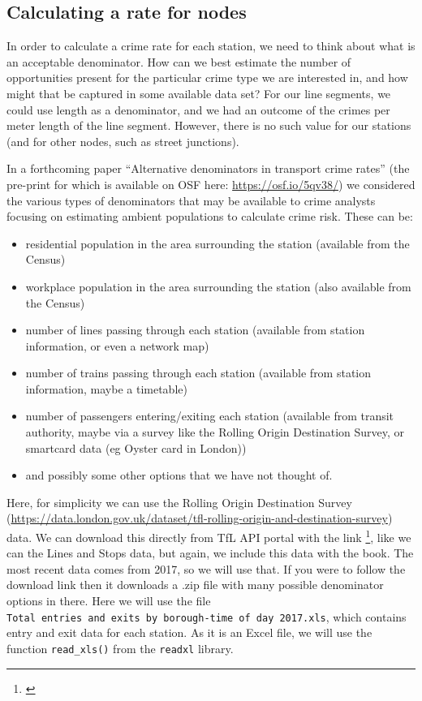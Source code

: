 \documentclass[
  krantz2]{krantz}
\providecommand{\tightlist}{%
  \setlength{\itemsep}{0pt}\setlength{\parskip}{0pt}}
\renewcommand{\href}[2]{#2\footnote{\url{#1}}}
\begin{document}
\hypertarget{calculating-a-rate-for-nodes}{%
\subsection{Calculating a rate for nodes}\label{calculating-a-rate-for-nodes}}

In order to calculate a crime rate for each station, we need to think about what is an acceptable denominator. How can we best estimate the number of opportunities present for the particular crime type we are interested in, and how might that be captured in some available data set? For our line segments, we could use length as a denominator, and we had an outcome of the crimes per meter length of the line segment. However, there is no such value for our stations (and for other nodes, such as street junctions).

In a forthcoming paper ``Alternative denominators in transport crime rates'' (the pre-print for which is available on OSF here: \url{https://osf.io/5qv38/}) we considered the various types of denominators that may be available to crime analysts focusing on estimating ambient populations to calculate crime risk. These can be:

\begin{itemize}
\tightlist
\item
  residential population in the area surrounding the station (available from the Census)
\item
  workplace population in the area surrounding the station (also available from the Census)
\item
  number of lines passing through each station (available from station information, or even a network map)
\item
  number of trains passing through each station (available from station information, maybe a timetable)
\item
  number of passengers entering/exiting each station (available from transit authority, maybe via a survey like the Rolling Origin Destination Survey, or smartcard data (eg Oyster card in London))
\item
  and possibly some other options that we have not thought of.
\end{itemize}

Here, for simplicity we can use the Rolling Origin Destination Survey (\url{https://data.london.gov.uk/dataset/tfl-rolling-origin-and-destination-survey}) data. We can download this directly from TfL API portal with the link \href{}{}, like we can the Lines and Stops data, but again, we include this data with the book. The most recent data comes from 2017, so we will use that. If you were to follow the download link then it downloads a .zip file with many possible denominator options in there. Here we will use the file \texttt{Total\ entries\ and\ exits\ by\ borough-time\ of\ day\ 2017.xls}, which contains entry and exit data for each station. As it is an Excel file, we will use the function \texttt{read\_xls()} from the \texttt{readxl} library.
\end{document}
